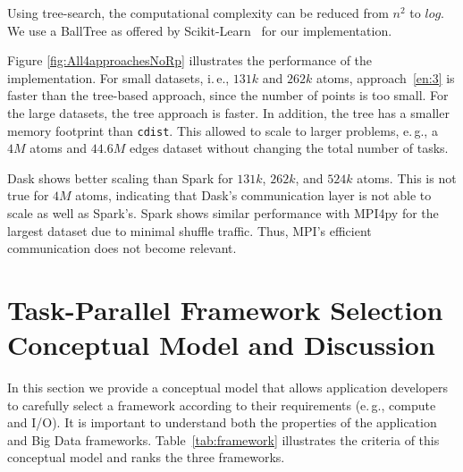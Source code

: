 Using tree-search, the computational complexity can be reduced from $n^2$ to $log$. 
We use a BallTree as offered by Scikit-Learn~\cite{scikit-nearest} for our implementation.

Figure \ref{fig:All4approachesNoRp} illustrates the performance of the implementation.
For small datasets, i.\,e., $131k$ and $262k$ atoms, approach~\ref{en:3} is faster than the tree-based approach, since the number of points is too small.
For the large datasets, the tree approach is faster.
In addition, the tree has a smaller memory footprint than \texttt{cdist}.
This allowed to scale to larger problems, e.\,g., a $4M$ atoms and $44.6M$ edges dataset without changing the total number of tasks.

Dask shows better scaling than Spark for $131k$, $262k$, and $524k$ atoms.
This is not true for $4M$ atoms, indicating that Dask's communication layer is not able to scale as well as Spark's.
Spark shows similar performance with MPI4py for the largest dataset due to minimal shuffle traffic.
Thus, MPI's efficient communication does not become relevant.

\section{Task-Parallel Framework Selection Conceptual Model and Discussion}
In this section we provide a conceptual model that allows application developers to carefully select a framework according to their requirements (e.\,g., compute and I/O).
It is important to understand both the properties of the application and Big Data frameworks.
Table~\ref{tab:framework} illustrates the criteria of this conceptual model and ranks the three frameworks.


